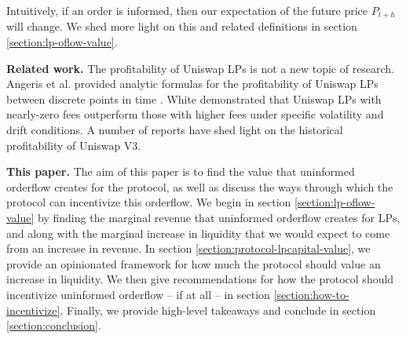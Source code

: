     Intuitively, if an order is informed, then our expectation of the future price $P_{t+h}$ will change. We shed more light on this and related definitions in section \ref{section:lp-oflow-value}.

    \textbf{Related work.}
    The profitability of Uniswap LPs is not a new topic of research. 
    Angeris et al. provided analytic formulas for the profitability of Uniswap LPs between discrete points in time \cite{angeris2019analysis}. %
    White demonstrated that Uniswap LPs with nearly-zero fees outperform those with higher fees under specific volatility and drift conditions. %
    A number of reports have shed light on the historical profitability of Uniswap V3. %

    \textbf{This paper.} The aim of this paper is to find the value that uninformed orderflow creates for the protocol, as well as discuss the ways through which the protocol can incentivize this orderflow.
    We begin in section \ref{section:lp-oflow-value} 
    by finding the marginal revenue that uninformed orderflow creates for LPs, and along with the marginal increase in liquidity that we would expect to come from an increase in revenue. In section \ref{section:protocol-lpcapital-value}, we provide an opinionated framework for how much the protocol should value an increase in liquidity.
    We then give recommendations for how the protocol should incentivize uninformed orderflow -- if at all -- in section \ref{section:how-to-incentivize}. Finally, we provide high-level takeaways and conclude in section \ref{section:conclusion}.
